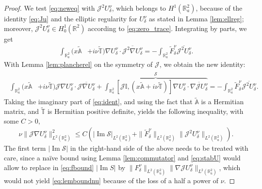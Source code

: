 \documentclass[10pt,a4paper]{amsart}
\renewcommand{\Im}{\operatorname{Im}}
\begin{document}
\begin{proof}
We test \eqref{eq:neweq} with $\mathcal{J}^2U^{\nu}_{\delta}$, which belongs to $H^1(\mathbb{R}^2_a)$, because of the identity \eqref{eq:Ju}  and the elliptic regularity for $U^{\nu}_{\delta}$ as stated in Lemma \ref{lem:ellreg}; moreover, $\mathcal{J}^2U^{\nu}_{\delta}\in H^1_0(\mathbb{R}^2)$ according to \eqref{eq:zero_trace}. Integrating by parts, we get
\begin{align*}
	\int_{\mathbb{R}^2_a}(x\widetilde{\mathbb{A}}&+i\nu\widetilde{\mathbb{T}})\nabla U^{\nu}_{\delta}\cdot \overline{\mathcal{J}^2\nabla U^{\nu}_{\delta}}=-\int_{\mathbb{R}^2_a}\widetilde{F}^{\nu}_{\delta}\overline{\mathcal{J}^2 U^{\nu}_{\delta}}.
\end{align*}
With Lemma \ref{lem:plancherel} on the symmetry of $\mathcal{J}$, we obtain the new identity:
\begin{align}
	\label{eq:ident}
	\begin{split}
		\int_{\mathbb{R}^2_a}(x\widetilde{\mathbb{A}}&+i\nu\widetilde{\mathbb{T}}) \mathcal{J}\nabla U^{\nu}_{\delta}\cdot \overline{\mathcal{J}\nabla U^{\nu}_{\delta}}+
		\overbrace{\int_{\mathbb{R}^2_a}[\mathcal{J}\mathbb{I},(x\widetilde{\mathbb{A}}+i\nu\widetilde{\mathbb{T}})]\nabla U^{\nu}_{\delta}\cdot \overline{\nabla \mathcal{J}U^{\nu}_{\delta}}}^{\mathcal{S}}=-\int_{\mathbb{R}^2_a}\widetilde{F}^{\nu}_{\delta}\overline{\mathcal{J}^2 U^{\nu}_{\delta}}.	
	\end{split}	
\end{align}
Taking the imaginary part of \eqref{eq:ident}, and using the fact that $\widetilde{\mathbb{A}}$ is a Hermitian matrix, and $\widetilde{\mathbb{T}}$ is Hermitian positive definite, yields the following inequality, with some $C>0$,
\begin{align}
	\label{eq:fbound}
	\nu\|\mathcal{J}\nabla U^{\nu}_{\delta}\|_{L^2(\mathbb{R}^2_a)}^2\leq C\left( |\Im \mathcal{S}|_{L^2(\mathbb{R}^2_a)}+\|\widetilde{F}^{\nu}_{\delta}\|_{L^2(\mathbb{R}^2_a)}\|\mathcal{J}^2 U^{\nu}_{\delta}\|_{L^2(\mathbb{R}^2_a)}\right).
\end{align}
The first term $|\Im\mathcal{S}|$ in the right-hand side of the above needs to be treated with care, since a na\"ive bound using Lemma \ref{lem:commutator} and \eqref{eq:stabU} would allow to replace  in \eqref{eq:fbound} $|\Im S|$ by  $\|F^{\nu}_{\delta}\|_{L^2(\mathbb{R}^2_a)}\|\nabla\mathcal{J}U^{\nu}_{\delta}\|_{L^2(\mathbb{R}^2_a)}$, which would not yield \eqref{eq:lemboundnu} because of the loss of a half a power of $\nu$.  


\end{proof}
\end{document}
